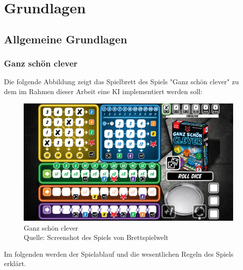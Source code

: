 \section{Grundlagen}
\subsection{Allgemeine Grundlagen}
\subsubsection{Ganz schön clever}
	Die folgende Abbildung zeigt das Spielbrett des Spiels "Ganz schön clever" zu dem im Rahmen dieser Arbeit eine KI implementiert werden soll:
	\nopagebreak
\begin{figure}[h]
	\includegraphics[width=1\textwidth]{Bilder/gsc} 
	\caption[Ganz schön clever]{Ganz schön clever\\ Quelle: Screenshot des Spiels von Brettspielwelt}
\end{figure}

Im folgenden werden der Spielablauf und die wesentlichen Regeln des Spiels erklärt.

